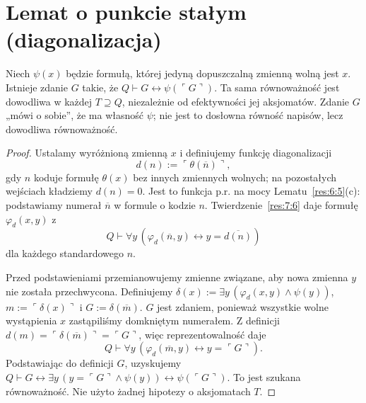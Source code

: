 \section{Lemat o punkcie stałym (diagonalizacja)}\label{sec:diagonalizacja}
\begin{lemat}\label{res:8:1}
Niech $\psi(x)$ będzie formułą, której jedyną dopuszczalną zmienną wolną jest $x$. Istnieje zdanie $G$ takie, że $Q\vdash G\leftrightarrow\psi(\ulcorner G\urcorner)$. Ta sama równoważność jest dowodliwa w każdej $T\supseteq Q$, niezależnie od efektywności jej aksjomatów. Zdanie $G$ „mówi o sobie”, że ma własność $\psi$; nie jest to dosłowna równość napisów, lecz dowodliwa równoważność.
\end{lemat}
\begin{proof}
Ustalamy wyróżnioną zmienną $x$ i definiujemy funkcję diagonalizacji
\[
d(n):=\ulcorner\theta(\overline n)\urcorner,
\]
gdy $n$ koduje formułę $\theta(x)$ bez innych zmiennych wolnych; na pozostałych wejściach kładziemy $d(n)=0$. Jest to funkcja p.r. na mocy Lematu~\ref{res:6:5}(c): podstawiamy numerał $\overline n$ w formule o kodzie $n$. Twierdzenie~\ref{res:7:6} daje formułę $\varphi_d(x,y)$ z
\[
Q\vdash\forall y\,(\varphi_d(\overline n,y)\leftrightarrow y=\overline{d(n)})
\]
dla każdego standardowego $n$.

Przed podstawieniami przemianowujemy zmienne związane, aby nowa zmienna $y$ nie została przechwycona. Definiujemy $\delta(x):=\exists y\,(\varphi_d(x,y)\land\psi(y))$, $m:=\ulcorner\delta(x)\urcorner$ i $G:=\delta(\overline m)$. $G$ jest zdaniem, ponieważ wszystkie wolne wystąpienia $x$ zastąpiliśmy domkniętym numerałem. Z definicji $d(m)=\ulcorner\delta(\overline m)\urcorner=\ulcorner G\urcorner$, więc reprezentowalność daje
\[
Q\vdash\forall y\,(\varphi_d(\overline m,y)\leftrightarrow y=\ulcorner G\urcorner).
\]
Podstawiając do definicji $G$, uzyskujemy $Q\vdash G\leftrightarrow\exists y\,(y=\ulcorner G\urcorner\land\psi(y))\leftrightarrow\psi(\ulcorner G\urcorner)$. To jest szukana równoważność. Nie użyto żadnej hipotezy o aksjomatach $T$.
\end{proof}

